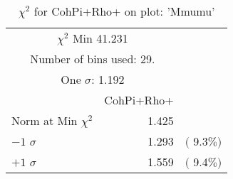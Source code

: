  \begin{table}[h!]\centering
 {\small{
 \begin{tabular}{||l||r||r||}
 \hline
 \hline
\multicolumn{2}{||c||}{$\chi^{2}$ Min  41.231} & \\
 \multicolumn{2}{||c||}{Number of bins used:   29.} & \\
\multicolumn{2}{||c||}{One $\sigma$:    1.192} & \\
 \hline
 \hline
    & CohPi+Rho+ & \\
Norm at Min $\chi^{2}$  &   1.425 & \\
$-1$ $\sigma$ &   1.293  &  $($  9.3$\%)$  \\
$+1$ $\sigma$ &   1.559  &  $($  9.4$\%)$  \\
 \hline
 \hline
 \end{tabular}
 \caption{$\chi^{2}$ for CohPi+Rho+ on plot: 'Mmumu'}
 \label{tab-chicohpip}
 }}
 \end{table}
 \endinput
